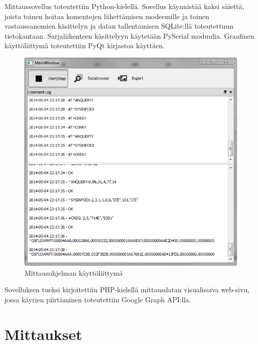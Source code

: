 \documentclass[11pt,a4paper,oneside,article,finnish]{memoir}
\begin{document}
Mittaussovellus toteutettiin Python-kielellä. Sovellus käynnistää kaksi säiettä, joista toinen hoitaa komentojen lähettämisen modeemille ja toinen vastaussanomien käsittelyn ja datan tallentamisen SQLite:llä toteutettuun tietokantaan. Sarjaliikenteen käsittelyyn käytetään PySerial moduulia. Graafinen käyttöliittymä toteutettiin PyQt kirjastoa käyttäen.

\begin{figure}[H]
	\centering
	\includegraphics[scale=0.75]{loggeri}
	\caption{Mittausohjelman käyttöliittymä}
	\label{fig:loggeri}
\end{figure}
Sovelluksen tueksi kirjoitettiin PHP-kielellä mittausdatan visualisoiva web-sivu, jossa käyrien piirtäminen toteutettiin Google Graph API:lla.


\chapter{Mittaukset}
\end{document}
